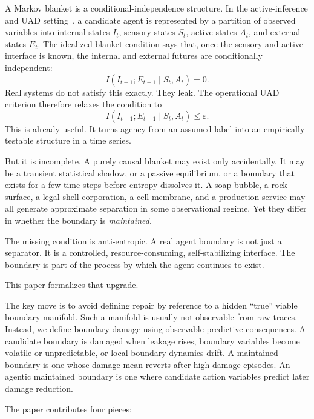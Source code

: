 \documentclass[11pt]{article}
\newcommand{\MI}{I}
\newcommand{\given}{\mid}
\begin{document}
A Markov blanket is a conditional-independence structure. In the active-inference and UAD setting~\cite{ramstead2022bayesian}, a candidate agent is represented by a partition of observed variables into internal states $I_t$, sensory states $S_t$, active states $A_t$, and external states $E_t$. The idealized blanket condition says that, once the sensory and active interface is known, the internal and external futures are conditionally independent:
\begin{equation}
  \MI(I_{t+1};E_{t+1}\given S_t,A_t) = 0.
  \label{eq:ideal-blanket}
\end{equation}
Real systems do not satisfy this exactly. They leak. The operational UAD criterion therefore relaxes the condition to
\begin{equation}
  \MI(I_{t+1};E_{t+1}\given S_t,A_t) \leq \varepsilon.
  \label{eq:epsilon-blanket}
\end{equation}
This is already useful. It turns agency from an assumed label into an empirically testable structure in a time series.

But it is incomplete. A purely causal blanket may exist only accidentally. It may be a transient statistical shadow, or a passive equilibrium, or a boundary that exists for a few time steps before entropy dissolves it. A soap bubble, a rock surface, a legal shell corporation, a cell membrane, and a production service may all generate approximate separation in some observational regime. Yet they differ in whether the boundary is \emph{maintained}.

The missing condition is anti-entropic. A real agent boundary is not just a separator. It is a controlled, resource-consuming, self-stabilizing interface. The boundary is part of the process by which the agent continues to exist.

This paper formalizes that upgrade.

The key move is to avoid defining repair by reference to a hidden ``true'' viable boundary manifold. Such a manifold is usually not observable from raw traces. Instead, we define boundary damage using observable predictive consequences. A candidate boundary is damaged when leakage rises, boundary variables become volatile or unpredictable, or local boundary dynamics drift. A maintained boundary is one whose damage mean-reverts after high-damage episodes. An agentic maintained boundary is one where candidate action variables predict later damage reduction.

The paper contributes four pieces:
\end{document}

